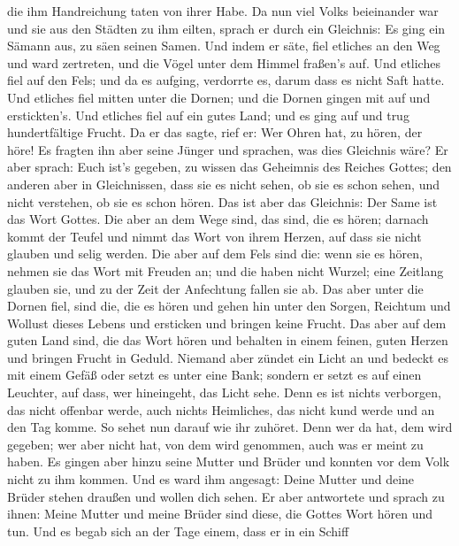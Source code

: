 die ihm Handreichung taten von ihrer Habe.  Da nun viel
Volks beieinander war und sie aus den Städten zu ihm eilten, sprach er
durch ein Gleichnis:  Es ging ein Sämann aus, zu säen seinen
Samen. Und indem er säte, fiel etliches an den Weg und ward zertreten,
und die Vögel unter dem Himmel fraßen's auf.  Und etliches
fiel auf den Fels; und da es aufging, verdorrte es, darum dass es nicht
Saft hatte.  Und etliches fiel mitten unter die Dornen; und
die Dornen gingen mit auf und erstickten's.  Und etliches
fiel auf ein gutes Land; und es ging auf und trug hundertfältige Frucht.
Da er das sagte, rief er: Wer Ohren hat, zu hören, der höre!
 Es fragten ihn aber seine Jünger und sprachen, was dies
Gleichnis wäre?  Er aber sprach: Euch ist's gegeben, zu
wissen das Geheimnis des Reiches Gottes; den anderen aber in
Gleichnissen, dass sie es nicht sehen, ob sie es schon sehen, und nicht
verstehen, ob sie es schon hören.  Das ist aber das
Gleichnis: Der Same ist das Wort Gottes.  Die aber an dem
Wege sind, das sind, die es hören; darnach kommt der Teufel und nimmt
das Wort von ihrem Herzen, auf dass sie nicht glauben und selig werden.
 Die aber auf dem Fels sind die: wenn sie es hören, nehmen
sie das Wort mit Freuden an; und die haben nicht Wurzel; eine Zeitlang
glauben sie, und zu der Zeit der Anfechtung fallen sie ab. 
Das aber unter die Dornen fiel, sind die, die es hören und gehen hin
unter den Sorgen, Reichtum und Wollust dieses Lebens und ersticken und
bringen keine Frucht.  Das aber auf dem guten Land sind,
die das Wort hören und behalten in einem feinen, guten Herzen und
bringen Frucht in Geduld.  Niemand aber zündet ein Licht an
und bedeckt es mit einem Gefäß oder setzt es unter eine Bank; sondern er
setzt es auf einen Leuchter, auf dass, wer hineingeht, das Licht sehe.
 Denn es ist nichts verborgen, das nicht offenbar werde,
auch nichts Heimliches, das nicht kund werde und an den Tag komme.
 So sehet nun darauf wie ihr zuhöret. Denn wer da hat, dem
wird gegeben; wer aber nicht hat, von dem wird genommen, auch was er
meint zu haben.  Es gingen aber hinzu seine Mutter und
Brüder und konnten vor dem Volk nicht zu ihm kommen.  Und
es ward ihm angesagt: Deine Mutter und deine Brüder stehen draußen und
wollen dich sehen.  Er aber antwortete und sprach zu ihnen:
Meine Mutter und meine Brüder sind diese, die Gottes Wort hören und tun.
 Und es begab sich an der Tage einem, dass er in ein Schiff

